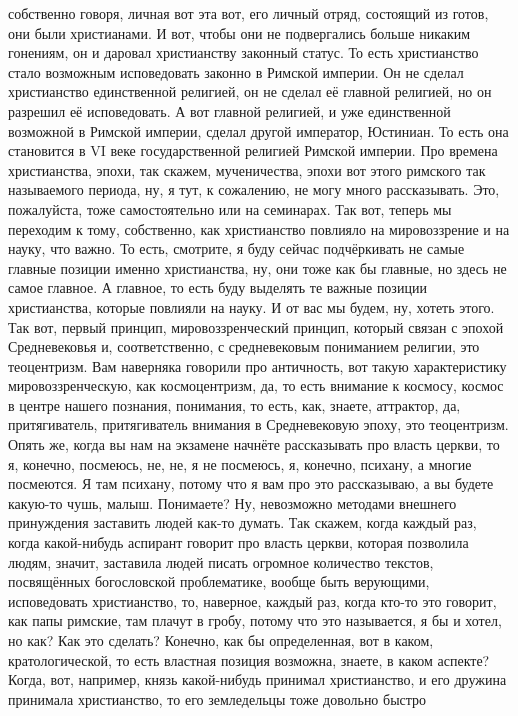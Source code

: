 собственно говоря, личная вот эта вот, его личный отряд, состоящий из готов, они
были христианами. И вот, чтобы они не подвергались больше никаким гонениям, он и
даровал христианству законный статус. То есть христианство стало возможным
исповедовать законно в Римской империи. Он не сделал христианство единственной
религией, он не сделал её главной религией, но он разрешил её исповедовать. А
вот главной религией, и уже единственной возможной в Римской империи, сделал
другой император, Юстиниан. То есть она становится в VI веке государственной
религией Римской империи. Про времена христианства, эпохи, так скажем,
мученичества, эпохи вот этого римского так называемого периода, ну, я тут, к
сожалению, не могу много рассказывать. Это, пожалуйста, тоже самостоятельно или
на семинарах. Так вот, теперь мы переходим к тому, собственно, как христианство
повлияло на мировоззрение и на науку, что важно. То есть, смотрите, я буду
сейчас подчёркивать не самые главные позиции именно христианства, ну, они тоже
как бы главные, но здесь не самое главное. А главное, то есть буду выделять те
важные позиции христианства, которые повлияли на науку. И от вас мы будем, ну,
хотеть этого. Так вот, первый принцип, мировоззренческий принцип, который связан
с эпохой Средневековья и, соответственно, с средневековым пониманием религии,
это теоцентризм. Вам наверняка говорили про античность, вот такую характеристику
мировоззренческую, как космоцентризм, да, то есть внимание к космосу, космос в
центре нашего познания, понимания, то есть, как, знаете, аттрактор, да,
притягиватель, притягиватель внимания в Средневековую эпоху, это теоцентризм.
Опять же, когда вы нам на экзамене начнёте рассказывать про власть церкви, то я,
конечно, посмеюсь, не, не, я не посмеюсь, я, конечно, психану, а многие
посмеются. Я там психану, потому что я вам про это рассказываю, а вы будете
какую-то чушь, малыш. Понимаете? Ну, невозможно методами внешнего принуждения
заставить людей как-то думать. Так скажем, когда каждый раз, когда какой-нибудь
аспирант говорит про власть церкви, которая позволила людям, значит, заставила
людей писать огромное количество текстов, посвящённых богословской проблематике,
вообще быть верующими, исповедовать христианство, то, наверное, каждый раз,
когда кто-то это говорит, как папы римские, там плачут в гробу, потому что это
называется, я бы и хотел, но как? Как это сделать? Конечно, как бы определенная,
вот в каком, кратологической, то есть властная позиция возможна, знаете, в каком
аспекте? Когда, вот, например, князь какой-нибудь принимал христианство, и его
дружина принимала христианство, то его земледельцы тоже довольно быстро

